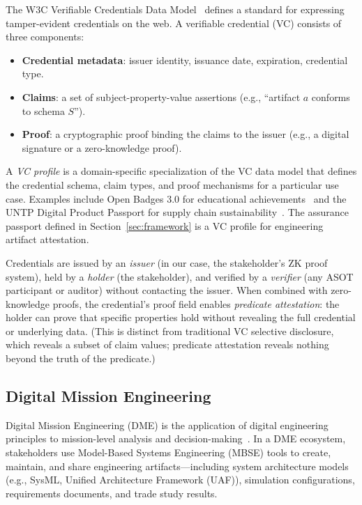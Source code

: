 The W3C Verifiable Credentials Data Model~\cite{w3c_vc} defines a standard for expressing tamper-evident credentials on the web.
A verifiable credential (VC) consists of three components:

\begin{itemize}
    \item \textbf{Credential metadata}: issuer identity, issuance date, expiration, credential type.
    \item \textbf{Claims}: a set of subject-property-value assertions (e.g., ``artifact $a$ conforms to schema $S$'').
    \item \textbf{Proof}: a cryptographic proof binding the claims to the issuer (e.g., a digital signature or a zero-knowledge proof).
\end{itemize}

A \emph{VC profile} is a domain-specific specialization of the VC data model that defines the credential schema, claim types, and proof mechanisms for a particular use case.
Examples include Open Badges 3.0 for educational achievements~\cite{open_badges3} and the UNTP Digital Product Passport for supply chain sustainability~\cite{untp_dpp}.
The assurance passport defined in Section~\ref{sec:framework} is a VC profile for engineering artifact attestation.

Credentials are issued by an \emph{issuer} (in our case, the stakeholder's ZK proof system), held by a \emph{holder} (the stakeholder), and verified by a \emph{verifier} (any ASOT participant or auditor) without contacting the issuer.
When combined with zero-knowledge proofs, the credential's proof field enables \emph{predicate attestation}: the holder can prove that specific properties hold without revealing the full credential or underlying data.
(This is distinct from traditional VC selective disclosure, which reveals a subset of claim values; predicate attestation reveals nothing beyond the truth of the predicate.)

\subsection{Digital Mission Engineering}
\label{sec:prelim-dme}

Digital Mission Engineering (DME) is the application of digital engineering principles to mission-level analysis and decision-making~\cite{dod_de_strategy, dod_me_guide2023}.
In a DME ecosystem, stakeholders use Model-Based Systems Engineering (MBSE) tools to create, maintain, and share engineering artifacts---including system architecture models (e.g., SysML, Unified Architecture Framework (UAF)), simulation configurations, requirements documents, and trade study results.

